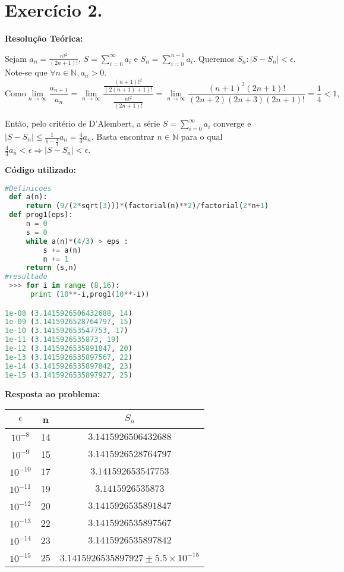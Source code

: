 \documentclass{article}
\begin{document}
\section*{Exercício 2.}

\textbf{Resolução Teórica:}\par
Sejam $a_n=\frac{n!^2}{(2n+1)!}$, $S=\sum\limits_{i=0}^{\infty}{a_i}$ e $S_n=\sum\limits_{i=0}^{n-1}{a_i}$. Queremos $S_n:|S-S_n|<\epsilon$. Note-se que $\forall n \in \mathbb{N}, a_n>0.$
 $$\text{Como}\lim_{n\to\infty}{\frac{a_{n+1}}{a_{n}}}=\lim_{n\to\infty}{\frac{\frac{(n+1)!^2}{(2(n+1)+1)!}}{\frac{n!^2}{(2n+1)!}}}=\lim_{n\to\infty}{\frac{(n+1)^2 (2n+1)!}{(2n+2)(2n+3)(2n+1)!}}=\frac{1}{4}<1,$$
\par Então, pelo critério de D'Alembert, a série $S=\sum\limits_{i=0}^{\infty}{a_i}$ converge e $|S-S_n|\leq \frac{1}{1-\frac{1}{4}}a_{n}=\frac{4}{3}a_{n}.$ Basta encontrar $n \in \mathbb{N}$ para o qual $\frac{4}{3}a_{n}<\epsilon \Rightarrow |S-S_n|<\epsilon.$
\newpage
\begin{flushleft}
\textbf{Código utilizado:}
\end{flushleft}
 \begin{lstlisting}[language = Python]
 #Definicoes
 def a(n):
     return (9/(2*sqrt(3)))*(factorial(n)**2)/factorial(2*n+1)
 def prog1(eps):
     n = 0
     s = 0
     while a(n)*(4/3) > eps :
         s += a(n)
         n += 1
     return (s,n)
#resultado
 >>> for i in range (8,16):
      print (10**-i,prog1(10**-i))

1e-08 (3.1415926506432688, 14)
1e-09 (3.1415926528764797, 15)
1e-10 (3.141592653547753, 17)
1e-11 (3.1415926535873, 19)
1e-12 (3.1415926535891847, 20)
1e-13 (3.1415926535897567, 22)
1e-14 (3.1415926535897842, 23)
1e-15 (3.1415926535897927, 25)\end{lstlisting}
\textbf{Resposta ao problema:}
\begin{center}
\begin{tabular}{|c|c|c|}
  \hline
  $\epsilon$& n  & $S_n$\\
  \hline
  $10^{-8}$ & 14 & $3.1415926506432688$\\
  \hline
  $10^{-9}$ & 15 & $3.1415926528764797$\\
  \hline
  $10^{-10}$ & 17 & $3.141592653547753$\\
  \hline
  $10^{-11}$ & 19 & $3.1415926535873$\\
  \hline
  $10^{-12}$ & 20 & $3.1415926535891847$\\
  \hline
  $10^{-13}$ & 22 & $3.1415926535897567$ \\
  \hline
  $10^{-14}$ & 23 & $3.1415926535897842$\\
  \hline
  $10^{-15}$ & 25 & $3.1415926535897927 \pm 5.5\times 10^{-15}$\\
  \hline
\end{tabular}
\end{center}
\end{document}

